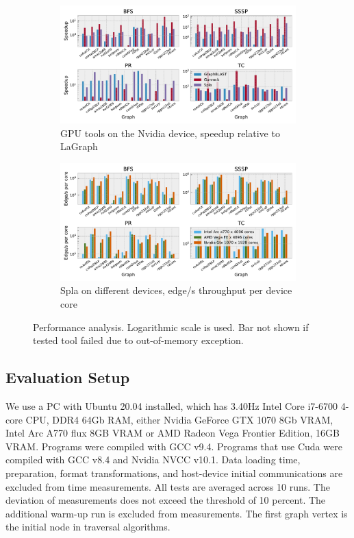 \begin{figure}[h]
    \centering
    \begin{subfigure}[b]{0.48\textwidth}
        \includegraphics[width=1.0\linewidth]{plots/rq1_rel.pdf}
        \caption{GPU tools on the Nvidia device, speedup relative to LaGraph}
        \label{fig:rq1_chart}
    \end{subfigure}
    \begin{subfigure}[b]{0.48\textwidth}
        \includegraphics[width=1.0\linewidth]{plots/rq2_cores.pdf}
        \caption{Spla on different devices, edge/s throughput per device core}
        \label{fig:rq2_chart}
    \end{subfigure}
    \caption{Performance analysis. Logarithmic scale is used. Bar not shown if tested tool failed due to out-of-memory exception.}
\end{figure}
        
\subsection{Evaluation Setup}

We use a PC with Ubuntu 20.04 installed, which has 3.40Hz Intel Core i7-6700 4-core CPU, DDR4 64Gb RAM, either Nvidia GeForce GTX 1070 8Gb VRAM, Intel Arc A770 flux 8GB VRAM or AMD Radeon Vega Frontier Edition, 16GB VRAM. Programs were compiled with GCC v9.4. Programs that use Cuda were compiled with GCC v8.4 and Nvidia NVCC v10.1.
Data loading time, preparation, format transformations, and host-device initial communications are excluded from time measurements. 
All tests are averaged across 10 runs. 
The deviation of measurements does not exceed the threshold of 10 percent. 
The additional warm-up run is excluded from measurements. 
The first graph vertex is the initial node in traversal algorithms.

